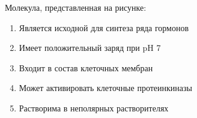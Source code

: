
Молекула, представленная на рисунке:


\begin{enumerate}
    \item Является исходной для синтеза ряда гормонов
    \item Имеет положительный заряд при pH 7
    \item Входит в состав клеточных мембран
    \item Может активировать клеточные протеинкиназы
    \item Растворима в неполярных растворителях
\end{enumerate}



